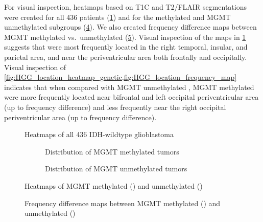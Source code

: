 For visual inspection, heatmaps based on \gls{T1C} and \gls{T2}/\gls{FLAIR} segmentations were created for all 436 patients (\cref{fig:HGG_location_heatmap}) and for the  methylated and \gls{MGMT} unmethylated subgroups (\cref{fig:HGG_location_heatmap_genetic}).
We also created frequency difference maps between \gls{MGMT} methylated vs.\ unmethylated  (\cref{fig:HGG_location_frequency_map}).
Visual inspection of the maps in \cref{fig:HGG_location_heatmap} suggests that  were most frequently located in the right temporal, insular, and parietal area, and near the periventricular area both frontally and occipitally.
Visual inspection of \cref{fig:HGG_location_heatmap_genetic,fig:HGG_location_frequency_map} indicates that when compared with \gls{MGMT} unmethylated , \gls{MGMT} methylated  were more frequently located near bifrontal and left occipital periventricular area (up to  frequency difference) and less frequently near the right occipital periventricular area (up to  frequency difference).

\begin{figure}[htbp]
\centering
{}
\caption{Heatmaps of all 436 \acrshort{IDH}-wildtype glioblastoma}\label{fig:HGG_location_heatmap}
\end{figure}

\begin{figure}[htbp]
    \centering
    \begin{subfigure}[b]{\textwidth}
        \centering
        \caption{Distribution of \gls{MGMT} methylated \glspl{tumor}}\label{fig:HGG_location_heatmap_methylated}
    \end{subfigure}
    \begin{subfigure}[b]{\textwidth}
        \centering
        \caption{Distribution of \gls{MGMT} unmethylated \glspl{tumor}}\label{fig:HGG_location_heatmap_unmethylated}
    \end{subfigure}
    \caption{Heatmaps of \acrshort{MGMT} methylated () and unmethylated () }\label{fig:HGG_location_heatmap_genetic}
\end{figure}


\begin{figure}[htbp]
    \centering
    \caption{Frequency difference maps between \acrshort{MGMT} methylated () and unmethylated () }\label{fig:HGG_location_frequency_map}
\end{figure}

